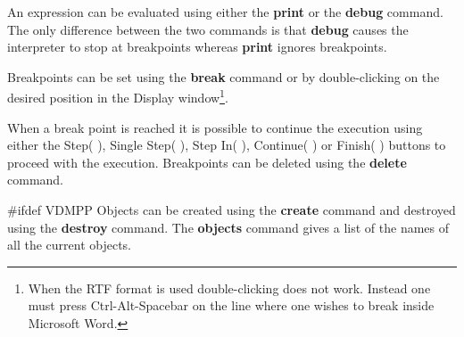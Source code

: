 \documentclass[\pformat,12pt]{article}
\newcommand{\guicmd}[1]{{\sf #1}}
\newcommand{\guicmd}[1]{{\gt #1}}
\begin{document}
An expression can be evaluated using either the
\textbf{print} or the
\textbf{debug} command.  The only difference
between the two commands 
is that {\bf debug} causes the interpreter to stop at breakpoints
whereas {\bf print} ignores breakpoints.

Breakpoints can be set using the \textbf{break} command
 or by 
double-clicking on the desired position in the \guicmd{Display}
window\footnote{When the RTF format is used double-clicking does not
work. Instead one must press Ctrl-Alt-Spacebar on the line where one
wishes to break inside Microsoft Word.}.

When a break point is reached
it is possible to continue the execution using either the
\guicmd{Step}(\hspace{-1.8mm}
),
\guicmd{Single Step}(\hspace{-1.8mm} 
),
\guicmd{Step In}(\hspace{-1.8mm}
),
\guicmd{Continue}(\hspace{-1.8mm}
)
or \guicmd{Finish}(\hspace{-1.8mm} 
)
buttons to proceed with the execution. Breakpoints can be deleted
using the \textbf{delete} command. 

#ifdef VDMPP
Objects can be created using the \textbf{create} command
 and destroyed
using the \textbf{destroy} command. The
\textbf{objects} command gives 
a list of the names of all the current objects.
\end{document}
